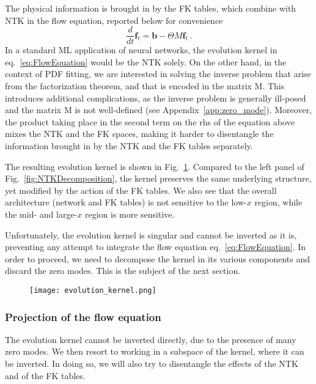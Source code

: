 \documentclass[11pt]{article}
\begin{document}
The physical information is brought in by the FK tables, which combine with NTK
in the flow equation, reported below for convenience
\begin{equation}
  \frac{d}{dt}\pmb{f}_t = \pmb{b} - \Theta M \pmb{f}_t \,.
  \label{eq:FlowEquation}
\end{equation}
In a standard ML application of neural networks, the evolution kernel in
eq.~\ref{eq:FlowEquation} would be the NTK solely. On the other hand, in the
context of PDF fitting, we are interested in solving the inverse problem that
arise from the factorization theorem, and that is encoded in the matrix M. This
introduces additional complications, as the inverse problem is generally
ill-posed and the matrix M is not well-defined (see
Appendix~\ref{app:zero_mode}). Moreover, the product taking place in the second
term on the rhs of the equation above mixes the NTK and the FK spaces, making it
harder to disentangle the information brought in by the NTK and the FK tables
separately. 

The resulting evolution kernel is shown in Fig.~\ref{fig:EvKernel}.
Compared to the left panel of Fig.~\eqref{fig:NTKDecomposition}, the kernel
preserves the same underlying structure, yet modified by the action of the FK
tables. We also see that the overall architecture (network and FK tables) is not
sensitive to the low-$x$ region, while the mid- and large-$x$ region is more
sensitive.

Unfortunately, the evolution kernel is singular and cannot be inverted as it is,
preventing any attempt to integrate the flow equation eq.~\eqref{eq:FlowEquation}.
In order to proceed, we need to decompose the kernel in its various components and
discard the zero modes. This is the subject of the next section.

\begin{figure}[!t]
  \centering
  \texttt{[image: evolution\_kernel.png]}
  \caption{\small}
  \label{fig:EvKernel}
\end{figure}

\subsubsection*{Projection of the flow equation}
The evolution kernel cannot be inverted directly, due to the presence of many zero
modes. We then resort to working in a subspace of the kernel, where it can be inverted.
In doing so, we will also try to disentangle the effects of the NTK and of the FK tables.
\end{document}
